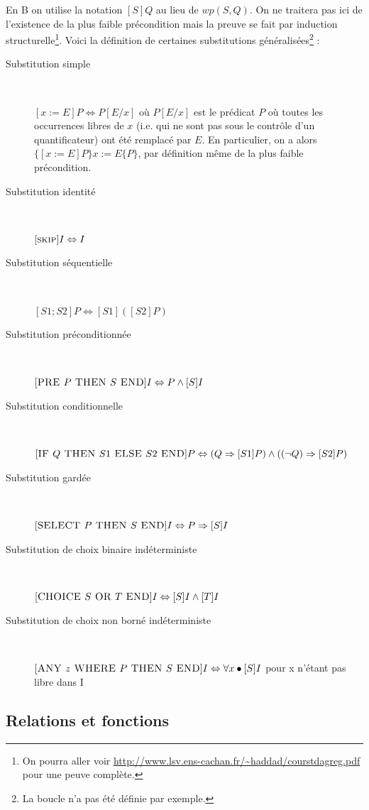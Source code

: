 \documentclass[10pt,a4paper]{article}
\begin{document}
En B on utilise la notation $[S]Q$ au lieu de $wp(S, Q)$. On ne traitera pas ici de l'existence de la plus faible précondition mais la preuve se fait par induction structurelle\footnote{On pourra aller voir \url{http://www.lsv.ens-cachan.fr/~haddad/courstdagreg.pdf} pour une peuve complète.}. Voici la définition de certaines substitutions généralisées\footnote{La boucle n'a pas été définie par exemple.} :
\begin{description}
\item[Substitution simple] ~

$[ x := E ]P \Leftrightarrow P[E/x]$ où $P[E/x]$ est le prédicat $P$ où toutes les occurrences libres de $x$ (i.e. qui ne sont pas sous le contrôle d'un quantificateur) ont été remplacé par $E$. En particulier, on a alors $\{ [x := E ]P \} x := E\{ P\}$, par définition même de la plus faible précondition.
\item[Substitution identité]  ~

$[\textsc{skip}]I \Leftrightarrow I$
\item[Substitution séquentielle]  ~

$[S1;S2]P 	\Leftrightarrow [S1]([S2]P)$
\item[Substitution préconditionnée]  ~

$[\textsc{PRE } P \textsc{ THEN } S \textsc{ END}]I \Leftrightarrow P \wedge [S]I$
\item[Substitution conditionnelle]  ~

$[\textsc{IF } Q \textsc{ THEN } S1 \textsc{ ELSE } S2 \textsc{ END}]P \Leftrightarrow (Q \Rightarrow [S1]P) \wedge( (\lnot Q)\Rightarrow [S2]P)$
\item[Substitution gardée]  ~

$[\textsc{SELECT } P \textsc{ THEN } S \textsc{ END}]I \Leftrightarrow P \Rightarrow [S]I$
\item[Substitution de choix binaire indéterministe]  ~

$[\textsc{CHOICE } S \textsc{ OR } T \textsc{ END}]I \Leftrightarrow [S]I \wedge [T ]I$
\item[Substitution de choix non borné indéterministe] ~

$[\textsc{ANY } z \textsc{ WHERE } P \textsc{ THEN } S \textsc{ END}]I \Leftrightarrow \forall x \bullet [S]I$ pour x n'étant pas libre dans I
\end{description}


\subsection{Relations et fonctions}
\end{document}
